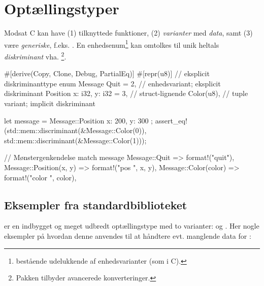 \documentclass{article}
\begin{document}
\newpage
\section*{Optællingstyper}

Modsat C kan  have
(1) tilknyttede funktioner,
(2) \emph{varianter} med \emph{data}, samt
(3) være \emph{generiske}, f.eks.  .
En enhedsenum\footnote{ bestående udelukkende af enhedsvarianter (som i C).} kan omtolkes til unik heltals \emph{diskriminant} vha. \footnote{Pakken  tilbyder avancerede konverteringer.}.

\begin{rustcode}
#[derive(Copy, Clone, Debug, PartialEq)]
#[repr(u8)] // eksplicit diskriminanttype
enum Message {
    Quit = 2, // enhedsvariant; eksplicit diskriminant
    Position {x: i32, y: i32} = 3, // struct-lignende
    Color(u8), // tuple variant; implicit diskriminant
}

let message = Message::Position { x: 200, y: 300 };
assert_eq!(std::mem::discriminant(&Message::Color(0)),
           std::mem::discriminant(&Message::Color(1)));

// Mønstergenkendelse
match message {
    Message::Quit => format!("quit"),
    Message::Position(x, y) => format!("pos {} {}", x, y),
    Message::Color(color) => format!("color {}", color),
}
\end{rustcode}

\newpage
\subsection*{Eksempler fra standardbiblioteket}
 er en indbygget og meget udbredt optællingstype med to varianter:
 og .
Her nogle eksempler på hvordan denne anvendes til at håndtere evt. manglende data for :
\end{document}
